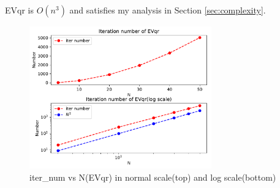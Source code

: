 \documentclass{article}
\begin{document}
EVqr is {\boldmath$O(n^3)$} and satisfies my analysis in Section \ref{sec:complexity}.
\begin{figure}[H]
    \centering
    \includegraphics[width=0.7\textwidth]{src/iter_num_unshifted.pdf}
    \caption{iter\_num vs N(EVqr) in normal scale(top) and log scale(bottom)}
    \label{fig:iter num evqr}
\end{figure}
\end{document}
